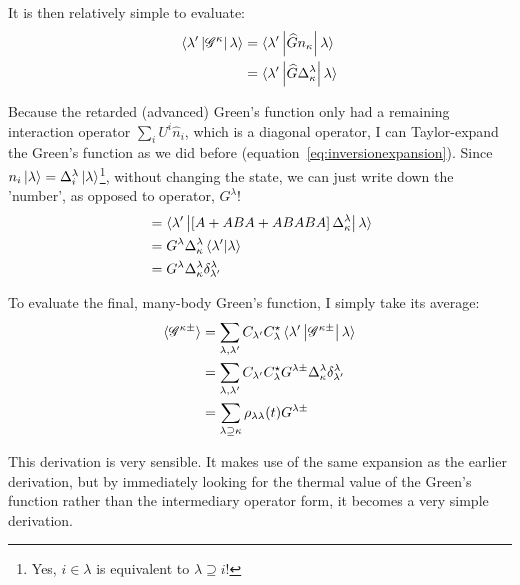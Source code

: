 It is then relatively simple to evaluate:
\begin{align*}
\braket{\lambda^\prime \left| \mathscr{G}^\kappa \right| \lambda } &= 
\braket{\lambda^\prime \left|  \widehat{G} n_\kappa \right| \lambda } \\
&= \braket{\lambda^\prime \left| \widehat{G} \Delta^\lambda_\kappa \right| \lambda }
\end{align*}

Because the retarded (advanced) Green's function only had a remaining interaction operator $\sum_i U^i \widehat{n}_i$, which is a diagonal operator, I can Taylor-expand the Green's function as we did before (equation~\ref{eq:inversionexpansion}). Since $n_i \ket{\lambda}=\Delta^\lambda_i\ket{\lambda}$\footnote{Yes, $i \in \lambda$ is equivalent to $\lambda\supseteq i$!}, without changing the state, we can just write down the 'number', as opposed to operator,  $G^\lambda$! 
\begin{align*}
&= \braket{\lambda^\prime \left| \left[ A + ABA + ABABA \right] \Delta^\lambda_\kappa \right| \lambda } \\
&=  G^\lambda \Delta^\lambda_\kappa \braket{\lambda^\prime | \lambda }\\
&=  G^\lambda \Delta^\lambda_\kappa \delta^\lambda_{\lambda^\prime}
\end{align*}

To evaluate the final, many-body Green's function, I simply take its average:
\begin{align*}
\braket{ \mathscr{G}^{\kappa\pm}} &= \sum_{\lambda,\lambda^\prime}C_{\lambda^\prime}C_\lambda^\star \braket{\lambda^\prime \left| \mathscr{G}^{\kappa\pm} \right| \lambda } \\
&= \sum_{\lambda,\lambda^\prime} C_{\lambda^\prime}C_\lambda^\star  G^{\lambda\pm} \Delta^\lambda_\kappa \delta^\lambda_{\lambda^\prime}\\
&= \sum_{\lambda \supseteq \kappa} \rho_{\lambda\lambda}(t) G^{\lambda\pm} 
\end{align*}

This derivation is very sensible. It makes use of the same expansion as the earlier derivation, but by immediately looking for the thermal value of the Green's function rather than the intermediary operator form, it becomes a very simple derivation.


